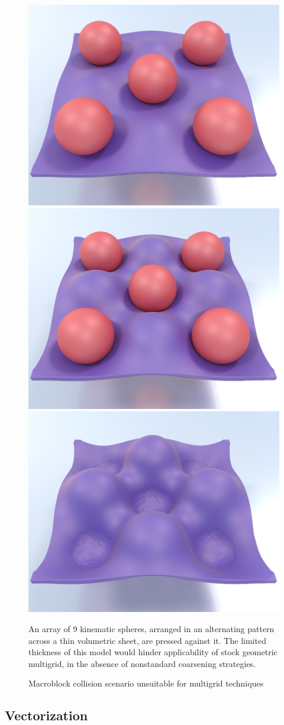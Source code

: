  \begin{figure}[t!] \begin{center} \includegraphics[width=.32\textwidth]{chapter_macroblocks/images/nineballs1.png} \includegraphics[width=.32\textwidth]{chapter_macroblocks/images/nineballs2.png} \includegraphics[width=.32\textwidth]{chapter_macroblocks/images/nineballs3.png} \end{center} \vspace{-.05in}
   \caption{Macroblock collision scenario unsuitable for multigrid
     techniques}{An array of 9 kinematic spheres, arranged in an
     alternating pattern across a thin volumetric sheet, are pressed
     against it. The limited thickness of this model would hinder
     applicability of stock geometric multigrid, in the absence of
     nonstandard coarsening strategies.}
   \vspace{-.15in} \label{fig:macroblocks:nineballs-example} \end{figure}

\subsection{Vectorization}
\label{sec:macroblocks:vectorization}

